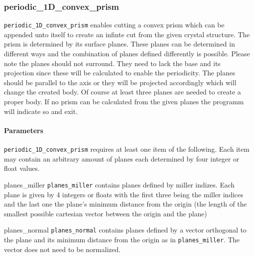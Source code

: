 \subsubsection{periodic\_1D\_convex\_prism}
\lstinline{periodic_1D_convex_prism} enables cutting a convex prism which can be appended unto itself to create an infinte cut from the given crystal structure. The prism is determined by its surface planes. These planes can be determined in different ways and the combination of planes defined differently is possible. Please note the planes should not surround. They need to lack the base and its projection since these will be calculated to enable the periodicity. The planes should be parallel to the axis or they will be projected accordingly which will change the created body. Of course at least three planes are needed to create a proper body. If no prism can be calculated from the given planes the programm will indicate so and exit.

\paragraph{Parameters}
\lstinline{periodic_1D_convex_prism} requires at least one item of the following. Each item may contain an arbitrary amount of planes each determined by four integer or float values.

\begin{description}
 \item{planes\_miller} \lstinline{planes_miller} contains planes defined by miller indizes. Each plane is given by 4 integers or floats with the first three being the miller indices and the last one the plane's minimum distance from the origin (the length of the smallest possible cartesian vector between the origin and the plane)
 \item{planes\_normal} \lstinline{planes_normal} contains planes defined by a vector orthogonal to the plane and its minimum distance from the origin as in \lstinline{planes_miller}. The vector does not need to be normalized.
\end{description} 



